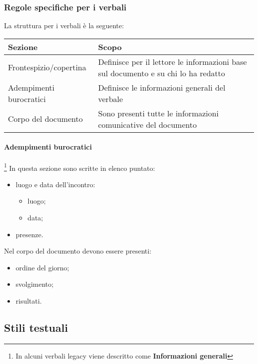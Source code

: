 \subsubsection{Regole specifiche per i verbali}

La struttura per i verbali è la seguente:

\begin{center}
    \begin{tabularx}{\linewidth}{l | X }            
        \textbf{Sezione} & \textbf{Scopo}\\
        \hline
        Frontespizio/copertina & Definisce per il lettore le informazioni base sul documento e su chi lo ha redatto\\
        Adempimenti burocratici & Definisce le informazioni generali del verbale\\
        Corpo del documento & Sono presenti tutte le informazioni comunicative del documento\\
    \end{tabularx}
\end{center}

\paragraph{Adempimenti burocratici}\footnote{In alcuni verbali legacy viene descritto come \textbf{Informazioni generali}} In questa sezione sono scritte in elenco puntato:

\begin{itemize}
    \item luogo e data dell'incontro:
	\begin{itemize}
		\item luogo;
		\item data;
	\end{itemize}
	\item presenze.
\end{itemize}

Nel corpo del documento devono essere presenti:

\begin{itemize}
    \item ordine del giorno;
    \item svolgimento;
    \item risultati.
\end{itemize}


\subsection{Stili testuali}
